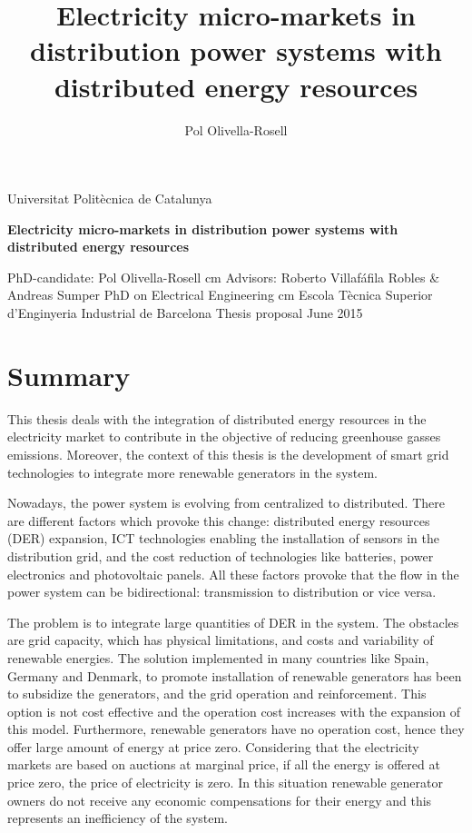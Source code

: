 \documentclass[a4paper,11pt,twoside,openright]{report}
\title{Electricity micro-markets in distribution power systems with distributed energy resources}
\author{Pol Olivella-Rosell}
\begin{document}
\pagestyle{empty}

\begin{center}
{\Large \sc Universitat Polit\`{e}cnica de Catalunya} \vskip 5cm

{\Large \bf Electricity micro-markets in distribution power systems with distributed energy resources}

\vskip 2cm {PhD-candidate: Pol Olivella-Rosell} 
 cm {Advisors: Roberto Villaf\'{a}fila Robles $\&$ Andreas Sumper}
\vskip 4cm 
{PhD on Electrical Engineering}  cm {Escola T\`{e}cnica Superior d'Enginyeria Industrial de Barcelona} \vskip 0.5cm {\sc } {Thesis proposal} \vskip 0.5cm {June 2015}
\end{center}

\tableofcontents
\newpage

\pagestyle{plain}

\chapter*{Summary}
\label{cap:summary}
This thesis deals with the integration of distributed energy resources in the electricity market to contribute in the objective of reducing greenhouse gasses emissions. Moreover, the context of this thesis is the development of smart grid technologies to integrate more renewable generators in the system. 

Nowadays, the power system is evolving from centralized to distributed. There are different factors which provoke this change: distributed energy resources (DER) expansion, ICT technologies enabling the installation of sensors in the distribution grid, and the cost reduction of technologies like batteries, power electronics and photovoltaic panels. All these factors provoke that the flow in the power system can be bidirectional: transmission to distribution or vice versa.

The problem is to integrate large quantities of DER in the system. The obstacles are grid capacity, which has physical limitations, and costs and variability of renewable energies. The solution implemented in many countries like Spain, Germany and Denmark, to promote installation of renewable generators has been to subsidize the generators, and the grid operation and reinforcement. This option is not cost effective and the operation cost increases with the expansion of this model. Furthermore, renewable generators have no operation cost, hence they offer large amount of energy at price zero. Considering that the electricity markets are based on auctions at marginal price, if all the energy is offered at price zero, the price of electricity is zero. In this situation renewable generator owners do not receive any economic compensations for their energy and this represents an inefficiency of the system.  
\end{document}
